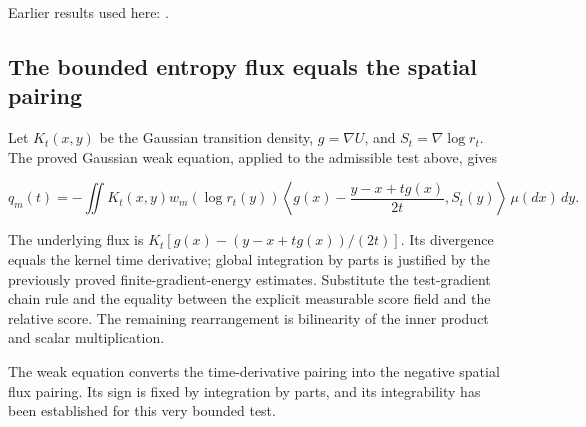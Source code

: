 \documentclass[11pt,a4paper]{report}
\begin{document}
Earlier results used here: \cite[Section~3.26.3]{LangevinLean2026ULASC}.
\subsection{\texorpdfstring{The bounded entropy flux equals the spatial pairing}{The bounded entropy flux equals the spatial pairing}}
\label{report-step-UnadjustedLangevin-LSI-GaussianEntropyIdentity-lean-10}


Let \(K_t(x,y)\) be the Gaussian transition density, \(g=\nabla U\), and \(S_t=\nabla\log r_t\). The proved Gaussian weak equation, applied to the admissible test above, gives

\[q_m(t)=-\iint K_t(x,y)w_m(\log r_t(y))\left\langle g(x)-\frac{y-x+tg(x)}{2t},S_t(y)\right\rangle\,\mu(dx)\,dy.\]

The underlying flux is \(K_t[g(x)-(y-x+tg(x))/(2t)]\). Its divergence equals the kernel time derivative; global integration by parts is justified by the previously proved finite-gradient-energy estimates. Substitute the test-gradient chain rule and the equality between the explicit measurable score field and the relative score. The remaining rearrangement is bilinearity of the inner product and scalar multiplication.



The weak equation converts the time-derivative pairing into the negative spatial flux pairing. Its sign is fixed by integration by parts, and its integrability has been established for this very bounded test.
\end{document}
